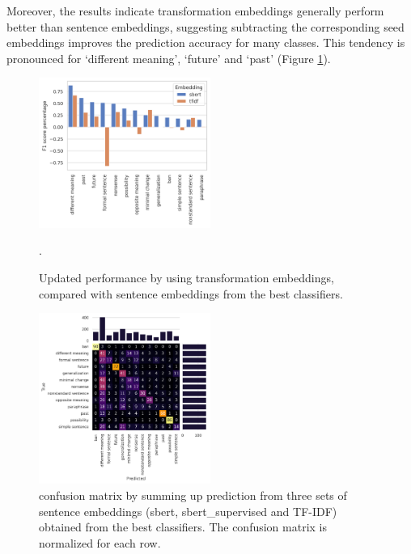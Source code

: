 \documentclass[11pt]{article}
\begin{document}
Moreover, the results indicate transformation embeddings generally perform better than sentence embeddings, suggesting subtracting the corresponding seed embeddings improves the prediction accuracy for many classes. This tendency is pronounced for `different meaning', `future' and `past' (Figure \ref{fig:cls_gs_labels_context_diff}). 
\begin{figure}[htp]
  \centering
  \includegraphics[width=0.5\textwidth]{figs/cls_gs_labels_context_diff.png}

  \caption{Updated performance by using transformation embeddings, compared with sentence embeddings from the best classifiers.}
 \label{fig:cls_gs_labels_context_diff}.
\end{figure}
\begin{figure}[htp]
  \centering
  \includegraphics[width=0.5\textwidth]{./figs/cls_gs_diff_conf_mat.png}
  \caption{confusion matrix by summing up prediction from three sets of sentence embeddings (sbert, sbert\_supervised and TF-IDF) obtained from the best classifiers. The confusion matrix
  is normalized for each row.}
  \label{fig:cls_gs_diff_conf_mat}
\end{figure}
\end{document}
